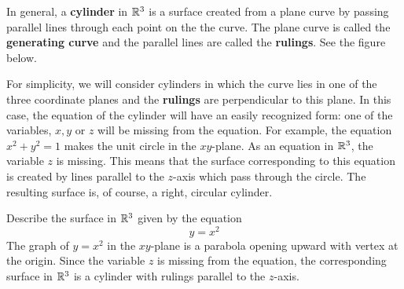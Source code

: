 \documentclass[handout]{ximera}
\begin{document}
In general, a \textbf{cylinder} in $\mathbb R^3$ is a surface created from a plane curve by passing parallel lines 
through each point on the the curve. The plane curve is called the \textbf{generating curve} and the parallel 
lines are called the \textbf{rulings}. See the figure below.
\begin{image}
\end{image}




For simplicity, we will consider cylinders in which the curve lies in one of the 
three coordinate planes and the {\bf rulings} are perpendicular to this plane.
In this case, the equation of the cylinder will have an easily recognized form: 
one of the variables, $x, y$ or $z$ will be missing from the equation.
For example, the equation $x^2+y^2 = 1$ makes the unit circle in the $xy$-plane.  
As an equation in $\mathbb R^3$, the variable $z$ is missing.  
This means that the surface corresponding to this equation is created by lines 
parallel to the $z$-axis which pass through the circle.
The resulting surface is, of course, a right, circular cylinder.
\begin{example}[Example 1]
Describe the surface in $\mathbb R^3$ given by the equation
\[
y= x^2
\]
The graph of $y = x^2$ in the $xy$-plane is a parabola opening upward with vertex at the origin.
Since the variable $z$ is missing from the equation, the corresponding surface in $\mathbb R^3$
is a cylinder with rulings parallel to the $z$-axis.
\end{example}
\end{document}

